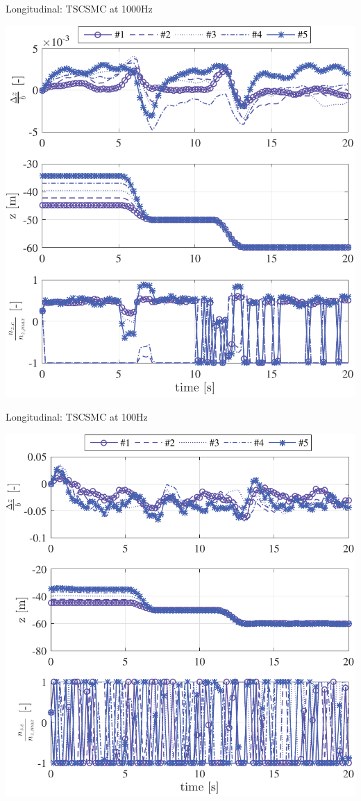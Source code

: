 \documentclass[12pt,svgnames,table,draft=false]{beamer}
\begin{document}
\begin{frame}{Longitudinal: TSCSMC \cite{galzi2006uav} at 1000Hz}
\begin{center}
\includegraphics[height=.6\paperwidth]{TSCSMC-1000Hz-TIMESCALESEPARATION-turbulence=1}    
\end{center}%
\end{frame}

\begin{frame}{Longitudinal: TSCSMC at 100Hz}
\begin{center}
\includegraphics[height=.6\paperwidth]{TSCSMC-100Hz-TIMESCALESEPARATION-turbulence=1}    
\end{center}%
\end{frame}
\end{document}
